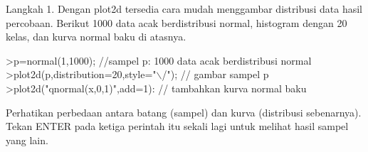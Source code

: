 \documentclass[a4paper,10pt]{article}
\begin{document}
\begin{eulernotebook}
\begin{eulercomment}
\begin{eulercomment}
\begin{eulercomment}
\begin{eulercomment}
\begin{eulercomment}
\begin{eulercomment}
\begin{eulercomment}
\begin{eulercomment}
\begin{eulercomment}
\begin{eulercomment}
\begin{eulercomment}
\end{eulercomment}
\begin{eulercomment}
Langkah 1. Dengan plot2d tersedia cara mudah menggambar distribusi data hasil percobaan.
Berikut 1000 data acak berdistribusi normal, histogram dengan 20 kelas, dan kurva normal
baku di atasnya.
\end{eulercomment}
\begin{eulerprompt}
>p=normal(1,1000); //sampel p: 1000 data acak berdistribusi normal
>plot2d(p,distribution=20,style="\(\backslash\)/"); // gambar sampel p
>plot2d("qnormal(x,0,1)",add=1): // tambahkan kurva normal baku
\end{eulerprompt}
\begin{eulercomment}
Perhatikan perbedaan antara batang (sampel) dan kurva (distribusi sebenarnya). Tekan ENTER
pada ketiga perintah itu sekali lagi untuk melihat hasil sampel yang lain.


\end{eulercomment}
\end{eulercomment}
\end{eulercomment}
\end{eulercomment}
\end{eulercomment}
\end{eulercomment}
\end{eulercomment}
\end{eulercomment}
\end{eulercomment}
\end{eulercomment}
\end{eulercomment}
\end{eulernotebook}
\end{document}

